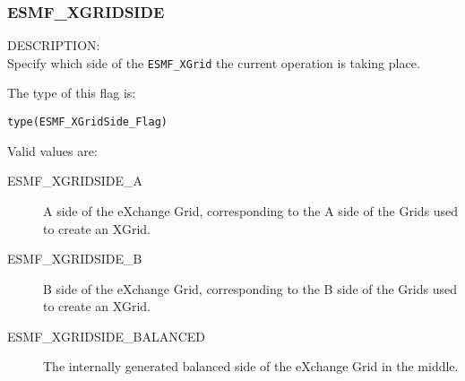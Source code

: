 
\subsubsection{ESMF\_XGRIDSIDE}
\label{opt:xgridoptions}

{\sf DESCRIPTION:\\}  
Specify which side of the {\tt ESMF\_XGrid} the current operation is taking place.

The type of this flag is:

{\tt type(ESMF\_XGridSide\_Flag)}

Valid values are:
\begin{description}
\item [ESMF\_XGRIDSIDE\_A]
  A side of the eXchange Grid, corresponding to the A side of the Grids used to create an XGrid.
\item [ESMF\_XGRIDSIDE\_B]
  B side of the eXchange Grid, corresponding to the B side of the Grids used to create an XGrid.
\item [ESMF\_XGRIDSIDE\_BALANCED]
  The internally generated balanced side of the eXchange Grid in the middle.
\end{description}
